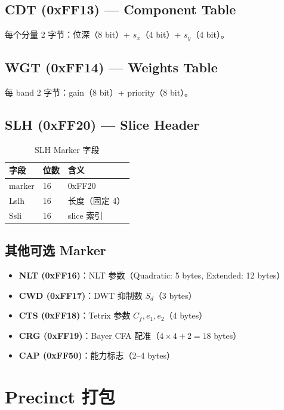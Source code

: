 \subsection{CDT (0xFF13) --- Component Table}

每个分量 2 字节：位深（8 bit）+ $s_x$（4 bit）+ $s_y$（4 bit）。

\subsection{WGT (0xFF14) --- Weights Table}

每 band 2 字节：gain（8 bit）+ priority（8 bit）。

\subsection{SLH (0xFF20) --- Slice Header}

\begin{table}[H]
\centering
\caption{SLH Marker 字段}
\label{tab:slh-fields}
\begin{tabular}{@{}lll@{}}
\toprule
字段 & 位数 & 含义 \\
\midrule
marker & 16 & 0xFF20 \\
Lslh & 16 & 长度（固定 4） \\
Ssli & 16 & slice 索引 \\
\bottomrule
\end{tabular}
\end{table}

\subsection{其他可选 Marker}

\begin{itemize}
  \item \textbf{NLT (0xFF16)}：NLT 参数（Quadratic: 5 bytes, Extended: 12 bytes）
  \item \textbf{CWD (0xFF17)}：DWT 抑制数 $S_d$（3 bytes）
  \item \textbf{CTS (0xFF18)}：Tetrix 参数 $C_f, e_1, e_2$（4 bytes）
  \item \textbf{CRG (0xFF19)}：Bayer CFA 配准（$4 \times 4 + 2 = 18$ bytes）
  \item \textbf{CAP (0xFF50)}：能力标志（2--4 bytes）
\end{itemize}

\section{Precinct 打包}

